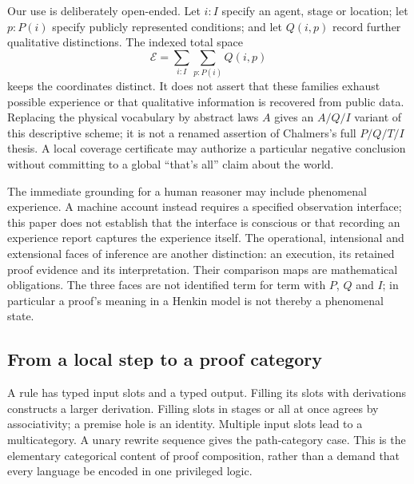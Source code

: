 \documentclass[11pt,a4paper]{article}
\theoremstyle{plain}
\theoremstyle{definition}
\theoremstyle{remark}
\begin{document}
Our use is deliberately open-ended. Let $i:I$ specify an agent, stage or
location; let $p:P(i)$ specify publicly represented conditions; and let
$Q(i,p)$ record further qualitative distinctions. The indexed total space
\[
     \mathcal E=\sum_{i:I}\sum_{p:P(i)}Q(i,p)
\]
keeps the coordinates distinct. It does not assert that these families exhaust
possible experience or that qualitative information is recovered from public
data. Replacing the physical vocabulary by abstract laws $A$ gives an
$A/Q/I$ variant of this descriptive scheme; it is not a renamed assertion of
Chalmers's full $P/Q/T/I$ thesis. A local coverage certificate may authorize a
particular negative conclusion without committing to a global ``that's all''
claim about the world.

The immediate grounding for a human reasoner may include phenomenal
experience. A machine account instead requires a specified observation
interface; this paper does not establish that the interface is conscious or
that recording an experience report captures the experience itself.
The operational, intensional and extensional faces of inference are another
distinction: an execution, its retained proof evidence and its interpretation.
Their comparison maps are mathematical obligations. The three faces are not
identified term for term with $P$, $Q$ and $I$; in particular a proof's meaning
in a Henkin model is not thereby a phenomenal state.

\subsection{From a local step to a proof category}

A rule has typed input slots and a typed output. Filling its slots with
derivations constructs a larger derivation. Filling slots in stages or all at
once agrees by associativity; a premise hole is an identity. Multiple input
slots lead to a multicategory. A unary rewrite sequence gives the path-category
case. This is the elementary categorical content of proof composition, rather
than a demand that every language be encoded in one privileged logic.

\begin{center}
\end{center}
\end{document}
